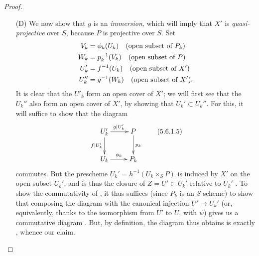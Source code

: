 \begin{proof}
\begin{enumerate}
  \item[(D)] We now show that $g$ is an \emph{immersion}, which will imply that $X'$ is \emph{quasi-projective} over $S$, because $P$ is projective over $S$.
    Set
    \begin{align*}
      V_k  &=\phi_k(U_k) \quad(\text{open subset of }P_k)\\
      W_k  &=p_k^{-1}(V_k)\quad(\text{open subset of }P)\\
      U_k' &=f^{-1}(U_k)  \quad(\text{open subset of }X')\\
      U_k''&=g^{-1}(W_k)  \quad(\text{open subset of }X').
    \end{align*}
    It is clear that the $U'_k$ form an open cover of $X'$; we will first see that the $U_k''$ also form an open cover of $X'$, by showing that $U_k'\subset U_k''$.
    For this, it will suffice to show that the diagram
    \[
    \label{II.5.6.1.5}
      \xymatrix{
        U_k'\ar[r]^{g|U_k'}\ar[d]_{f|U_k'} &
        P\ar[d]^{p_k}\\
        U_k\ar[r]^{\vphi_k} &
        P_k
      }
      \tag{5.6.1.5}
    \]
    commutes.
    But the prescheme $U_k'=h^{-1}(U_k\times_S P)$ is induced by $X'$ on the open subset $U_k'$, and is thus the closure of $Z=U'\subset U_k'$ relative to $U_k'$ .
    To show the commutativity of , it thus suffices (since $P_k$ is an $S$-scheme) to show that composing the diagram with the canonical injection $U'\to U_k'$ (or, equivalently, thanks to the isomorphism from $U'$ to $U$, with $\psi$) gives us a commutative diagram .
    But, by definition, the diagram thus obtains is exactly , whence our claim.


\end{enumerate}
\end{proof}
